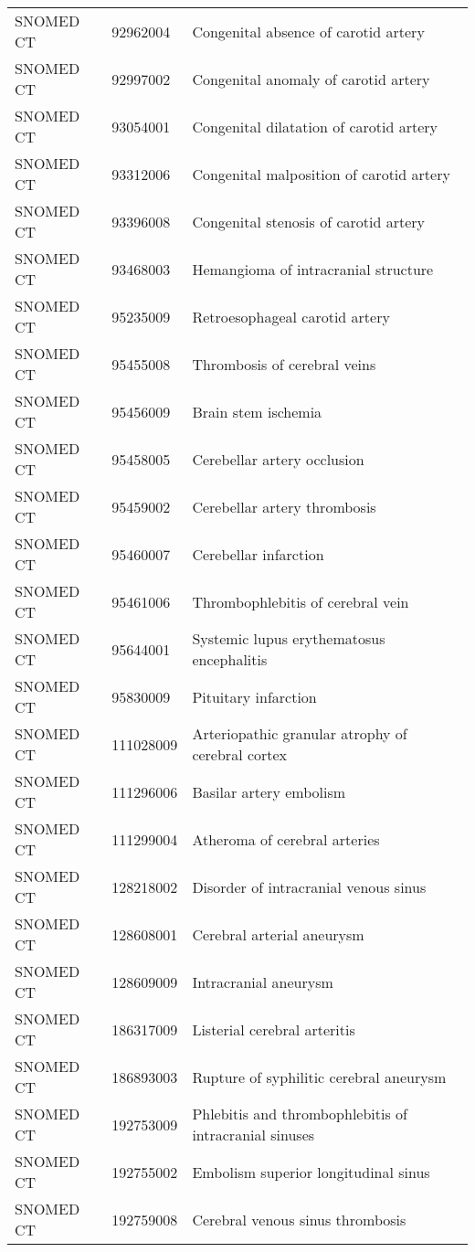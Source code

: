 \begin{longtable}{p{}p{}p{}}
  SNOMED CT & 92962004 & Congenital absence of carotid artery \\ 
  SNOMED CT & 92997002 & Congenital anomaly of carotid artery \\ 
  SNOMED CT & 93054001 & Congenital dilatation of carotid artery \\ 
  SNOMED CT & 93312006 & Congenital malposition of carotid artery \\ 
  SNOMED CT & 93396008 & Congenital stenosis of carotid artery \\ 
  SNOMED CT & 93468003 & Hemangioma of intracranial structure \\ 
  SNOMED CT & 95235009 & Retroesophageal carotid artery \\ 
  SNOMED CT & 95455008 & Thrombosis of cerebral veins \\ 
  SNOMED CT & 95456009 & Brain stem ischemia \\ 
  SNOMED CT & 95458005 & Cerebellar artery occlusion \\ 
  SNOMED CT & 95459002 & Cerebellar artery thrombosis \\ 
  SNOMED CT & 95460007 & Cerebellar infarction \\ 
  SNOMED CT & 95461006 & Thrombophlebitis of cerebral vein \\ 
  SNOMED CT & 95644001 & Systemic lupus erythematosus encephalitis \\ 
  SNOMED CT & 95830009 & Pituitary infarction \\ 
  SNOMED CT & 111028009 & Arteriopathic granular atrophy of cerebral cortex \\ 
  SNOMED CT & 111296006 & Basilar artery embolism \\ 
  SNOMED CT & 111299004 & Atheroma of cerebral arteries \\ 
  SNOMED CT & 128218002 & Disorder of intracranial venous sinus \\ 
  SNOMED CT & 128608001 & Cerebral arterial aneurysm \\ 
  SNOMED CT & 128609009 & Intracranial aneurysm \\ 
  SNOMED CT & 186317009 & Listerial cerebral arteritis \\ 
  SNOMED CT & 186893003 & Rupture of syphilitic cerebral aneurysm \\ 
  SNOMED CT & 192753009 & Phlebitis and thrombophlebitis of intracranial sinuses \\ 
  SNOMED CT & 192755002 & Embolism superior longitudinal sinus \\ 
  SNOMED CT & 192759008 & Cerebral venous sinus thrombosis \\ 

\end{longtable}
